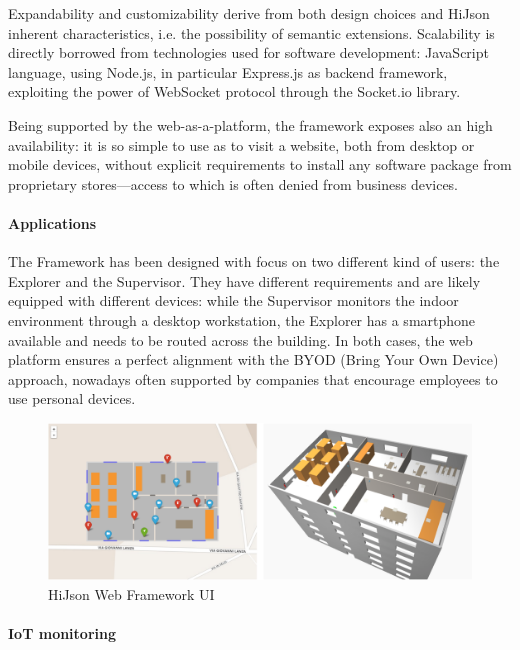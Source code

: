 \documentclass{sig-alternate}
\begin{document}
Expandability and customizability derive from both design choices and HiJson inherent characteristics, i.e. the possibility of semantic extensions. Scalability is directly borrowed from technologies used for software development: JavaScript language, using Node.js, in particular Express.js as backend framework, exploiting the power of WebSocket protocol through the Socket.io library.

Being supported by the web-as-a-platform, the framework exposes also an high availability: it is so simple to use as to visit a website, both from desktop or mobile devices, without explicit requirements to install any software package from proprietary stores---access to which is often denied from business devices.

\paragraph{Applications}

The Framework has been designed with focus on two different kind of users: the Explorer and the Supervisor. They have different requirements and are likely equipped with different devices: while the Supervisor monitors the indoor environment through a desktop workstation, the Explorer has a smartphone available and needs to be routed across the building.
In both cases, the web platform ensures a perfect alignment with the BYOD (Bring Your Own Device) approach, nowadays often supported by companies that encourage employees to use personal devices.


\begin{figure}[htb]
\centering
\includegraphics[width=\linewidth]{../images/2D-3D}
\caption{HiJson Web Framework UI}
\label{fig:web-framework-ui}
\end{figure}

\paragraph{IoT monitoring}
\end{document}
